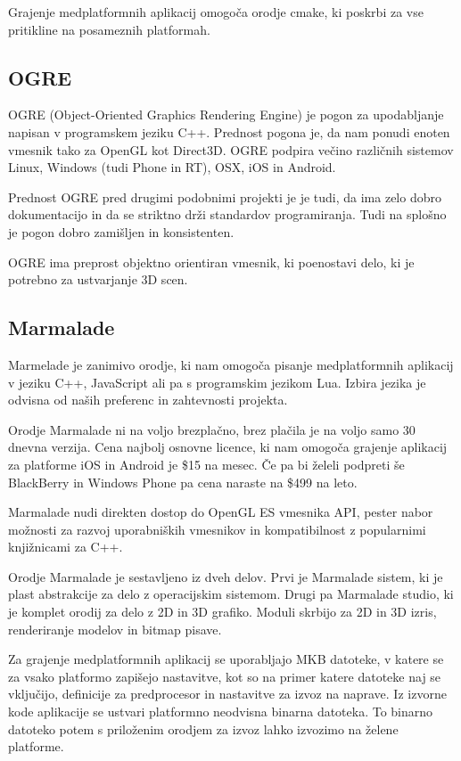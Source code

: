 Grajenje medplatformnih aplikacij omogoča orodje cmake, ki poskrbi za vse pritikline na posameznih platformah. 

\subsection{OGRE}

OGRE (Object-Oriented Graphics Rendering Engine) \cite{ogre} je pogon za upodabljanje napisan v programskem jeziku C++. Prednost pogona je, da nam ponudi enoten vmesnik tako za OpenGL kot Direct3D. OGRE podpira večino različnih sistemov Linux, Windows (tudi Phone in RT), OSX, iOS in Android.

Prednost OGRE pred drugimi podobnimi projekti je je tudi, da ima zelo dobro dokumentacijo in da se striktno drži standardov programiranja. Tudi na splošno je pogon dobro zamišljen in konsistenten.

OGRE ima preprost objektno orientiran vmesnik, ki poenostavi delo, ki je potrebno za ustvarjanje 3D scen.

\subsection{Marmalade}

Marmelade \cite{marmalade} je zanimivo orodje, ki nam omogoča pisanje medplatformnih aplikacij v jeziku C++, JavaScript ali pa s programskim jezikom Lua. Izbira jezika je odvisna od naših preferenc in zahtevnosti projekta.

Orodje Marmalade ni na voljo brezplačno, brez plačila je na voljo samo 30 dnevna verzija. Cena najbolj osnovne licence, ki nam omogoča grajenje aplikacij za platforme iOS in Android je \$15 na mesec. Če pa bi želeli podpreti še BlackBerry in Windows Phone pa cena naraste na \$499 na leto.

Marmalade nudi direkten dostop do OpenGL ES vmesnika API, pester nabor možnosti za razvoj uporabniških vmesnikov in kompatibilnost z popularnimi knjižnicami za C++. 

Orodje Marmalade je sestavljeno iz dveh delov. Prvi je Marmalade sistem, ki je plast abstrakcije za delo z operacijskim sistemom. Drugi pa Marmalade studio, ki je komplet orodij za delo z 2D in 3D grafiko. Moduli skrbijo za 2D in 3D izris, renderiranje modelov in bitmap pisave.

Za grajenje medplatformnih aplikacij se uporabljajo MKB datoteke, v katere se za vsako platformo zapišejo nastavitve, kot so na primer katere datoteke naj se vključijo, definicije za predprocesor in nastavitve za izvoz na naprave. Iz izvorne kode aplikacije se ustvari platformno neodvisna binarna datoteka. To binarno datoteko potem s priloženim orodjem za izvoz lahko izvozimo na želene platforme.

